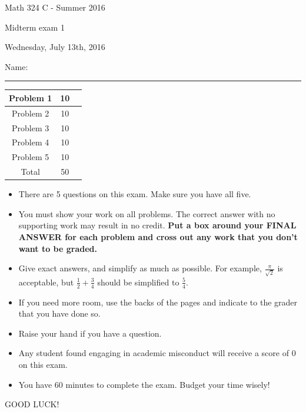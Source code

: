 \documentclass[12 pt]{report}
\begin{document}
\noindent \vfill \noindent \large

\centerline{Math 324 C  - Summer 2016}

\centerline{Midterm exam 1}

\centerline{Wednesday, July 13th, 2016}

\normalsize

\vfill
\medskip
Name: \rule{10cm}{1pt}

\bigskip

\vfill
\begin{center}
{\large
\begin{tabular}{||c|c|r||}
\hline Problem 1 & 10 & \hspace{10mm} \hfill \\
\hline Problem 2 & 10  & \hspace{10mm} \hfill \\
\hline Problem 3 & 10 & \hspace{10mm} \hfill \\
\hline Problem 4 & 10  & \hspace{10mm} \hfill \\
\hline Problem 5 & 10  & \hspace{10mm} \hfill \\
\hline Total & 50 & \hspace{10mm} \hfill \\
\hline
\end{tabular}
}
\end{center}
\vfill
\begin{itemize}
\item There are 5 questions on this exam. Make sure you have all five.
\item You must show your work on all problems.  The correct answer
with no supporting work may result in no credit. \textbf{Put a box
around your FINAL ANSWER for each problem and cross out any work
that you don't want to be graded.} 
\item Give exact answers, and simplify as much as possible. 
For example, $\frac{\pi}{\sqrt{2}}$ is acceptable, but $\frac{1}{2} + \frac{3}{4}$
should be simplified to $\frac{5}{4}$.  

\item If you need more room, use the backs
of the pages and indicate to the grader that you have done so.
\item Raise your hand if you have a question.
\item Any student found engaging in academic misconduct will receive
a score of 0 on this exam.
\item You have 60 minutes to complete the exam.  Budget your time wisely! \\
\end{itemize}
\vfill
\begin{center}GOOD LUCK!\end{center}
\end{document}
